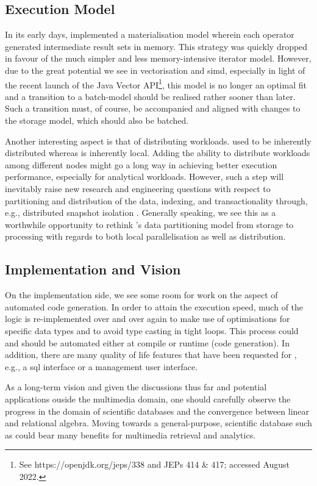 \subsection{Execution Model}
In its early days, \cottontail{} implemented a materialisation model wherein each operator generated intermediate result sets in memory. This strategy was quickly dropped in favour of the much simpler and less memory-intensive iterator model. However, due to the great potential we see in vectorisation and \acrshort{simd}, especially in light of the recent launch of the Java Vector API\footnote{See https://openjdk.org/jeps/338 and JEPs 414 \& 417; accessed August 2022.}, this model is no longer an optimal fit and a transition to a batch-model should be realised rather sooner than later. Such a transition must, of course, be accompanied and aligned with changes to the storage model, which should also be batched.

Another interesting aspect is that of distributing workloads. \adampro{} used to be inherently distributed \cite{Giangreco:2016Adam,Giangreco:2018Database} whereas \cottontail{} is inherently local. Adding the ability to distribute workloads among different nodes might go a long way in achieving better execution performance, especially for analytical workloads. However, such a step will inevitably raise new research and engineering questions with respect to partitioning and distribution of the data, indexing, and transactionality through, e.g., distributed snapshot isolation \cite{Binnig:2014Distributed}. Generally speaking, we see this as a worthwhile opportunity to rethink \cottontail's data partitioning model from storage to processing with regards to both local parallelisation as well as distribution.

\subsection{Implementation and Vision}
On the implementation side, we see some room for work on the aspect of automated code generation. In order to attain the execution speed, much of the logic is re-implemented over and over again to make use of optimisations for specific data types and to avoid type casting in tight loops. This process could and should be automated either at compile or runtime (code generation). In addition, there are many quality of life features that have been requested for \cottontail{}, e.g., a \acrshort{sql} interface or a management user interface.

As a long-term vision and given the discussions thus far and potential applications ouside the multimedia domain, one should carefully observe the progress in the domain of scientific databases and the convergence between linear and relational algebra. Moving towards a general-purpose, scientific database such as \cite{Stonebraker:2013SciDB,Luo:2018Scalable,Blacher:2022Machine} could bear many benefits for multimedia retrieval and analytics.